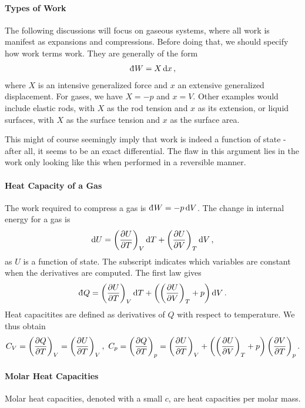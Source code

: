 \paragraph{Types of Work}
The following discussions will focus on gaseous systems, where all work is manifest as expansions and compressions. Before doing that, we should specify how work terms work. They are generally of the form
\begin{align*}
	\din{W} = X\dd{x},
\end{align*}
where $X$ is an intensive generalized force and $x$ an extensive generalized displacement. For gases, we have $X = -p$ and $x = V$. Other examples would include elastic rods, with $X$ as the rod tension and $x$ as its extension, or liquid surfaces, with $X$ as the surface tension and $x$ as the surface area.

This might of course seemingly imply that work is indeed a function of state - after all, it seems to be an exact differential. The flaw in this argument lies in the work only looking like this when performed in a reversible manner.

\paragraph{Heat Capacity of a Gas}
The work required to compress a gas is $\din{W} = -p\dd{V}$. The change in internal energy for a gas is
\begin{align*}
	\dd{U} = \fix{\pdv{U}{T}}{V}\dd{T} + \fix{\pdv{U}{V}}{T}\dd{V},
\end{align*}
as $U$ is a  function of state. The subscript indicates which variables are constant when the derivatives are computed. The first law gives
\begin{align*}
	\din{Q} = \fix{\pdv{U}{T}}{V}\dd{T} + \left(\fix{\pdv{U}{V}}{T} + p\right)\dd{V}.
\end{align*}
Heat capacitites are defined as derivatives of $Q$ with respect to temperature. We thus obtain
\begin{align*}
	C_{V} = \fix{\pdv{Q}{T}}{V} = \fix{\pdv{U}{T}}{V},\ C_{p} = \fix{\pdv{Q}{T}}{p} = \fix{\pdv{U}{T}}{V} + \left(\fix{\pdv{U}{V}}{T} + p\right)\fix{\pdv{V}{T}}{p}.
\end{align*}

\paragraph{Molar Heat Capacities}
Molar heat capacities, denoted with a small $c$, are heat capacities per molar mass.

